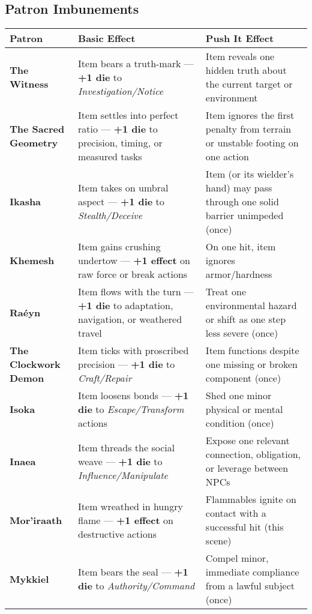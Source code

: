 \documentclass[12pt,twoside]{book}
\begin{document}
\subsection*{Patron Imbunements}

\begin{table}[htbp]
\centering
\small
\renewcommand{\arraystretch}{1.1}
\begin{tabular}{>{\bfseries}p{3.2cm} >{\raggedright\arraybackslash}p{6.1cm} >{\raggedright\arraybackslash}p{6.1cm}}
\toprule
\textbf{Patron} & \textbf{Basic Effect} & \textbf{Push It Effect} \\
\midrule
The Witness & Item bears a truth-mark — \textbf{+1 die} to \emph{Investigation/Notice} & Item reveals one hidden truth about the current target or environment \\
The Sacred Geometry & Item settles into perfect ratio — \textbf{+1 die} to precision, timing, or measured tasks & Item ignores the first penalty from terrain or unstable footing on one action \\
Ikasha & Item takes on umbral aspect — \textbf{+1 die} to \emph{Stealth/Deceive} & Item (or its wielder’s hand) may pass through one solid barrier unimpeded (once) \\
Khemesh & Item gains crushing undertow — \textbf{+1 effect} on raw force or break actions & On one hit, item ignores armor/hardness \\
Raéyn & Item flows with the turn — \textbf{+1 die} to adaptation, navigation, or weathered travel & Treat one environmental hazard or shift as one step less severe (once) \\
The Clockwork Demon & Item ticks with proscribed precision — \textbf{+1 die} to \emph{Craft/Repair} & Item functions despite one missing or broken component (once) \\
Isoka & Item loosens bonds — \textbf{+1 die} to \emph{Escape/Transform} actions & Shed one minor physical or mental condition (once) \\
Inaea & Item threads the social weave — \textbf{+1 die} to \emph{Influence/Manipulate} & Expose one relevant connection, obligation, or leverage between NPCs \\
Mor'iraath & Item wreathed in hungry flame — \textbf{+1 effect} on destructive actions & Flammables ignite on contact with a successful hit (this scene) \\
Mykkiel & Item bears the seal — \textbf{+1 die} to \emph{Authority/Command} & Compel minor, immediate compliance from a lawful subject (once) \\

\end{tabular}
\end{table}
\end{document}
